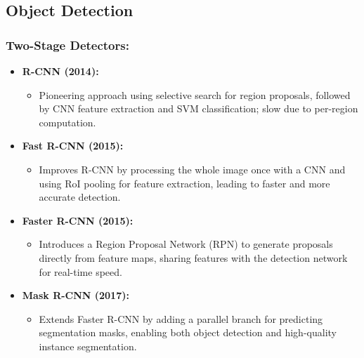 \documentclass{article}
\begin{document}
\subsection{Object Detection}
\subsubsection{Two-Stage Detectors:}
\begin{itemize}[leftmargin=1.5em]
  \item \textbf{R-CNN (2014):} 
    \begin{itemize}
      \item Pioneering approach using selective search for region proposals, followed by CNN feature extraction and SVM classification; slow due to per-region computation.
    \end{itemize}
  \item \textbf{Fast R-CNN (2015):}
    \begin{itemize}
      \item Improves R-CNN by processing the whole image once with a CNN and using RoI pooling for feature extraction, leading to faster and more accurate detection.
    \end{itemize}
  \item \textbf{Faster R-CNN (2015):}
    \begin{itemize}
      \item Introduces a Region Proposal Network (RPN) to generate proposals directly from feature maps, sharing features with the detection network for real-time speed.
    \end{itemize}
  \item \textbf{Mask R-CNN (2017):}
    \begin{itemize}
      \item Extends Faster R-CNN by adding a parallel branch for predicting segmentation masks, enabling both object detection and high-quality instance segmentation.
    \end{itemize}
\end{itemize}
\end{document}
